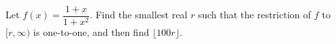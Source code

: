 Let $f(x)=\dfrac{1+x}{1+x^2}$. Find the smallest real $r$ such that the restriction of $f$ to $[r,\infty)$ is one-to-one, and then find $\lfloor100r\rfloor$.
